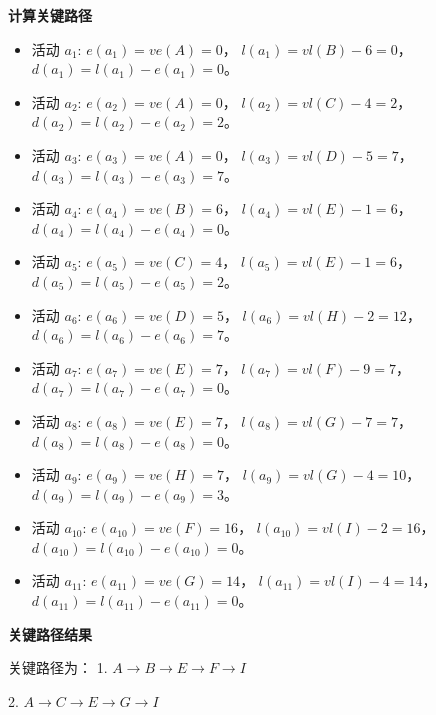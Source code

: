 \documentclass[lang=cn,newtx,10pt,scheme=chinese]{elegantbook}
\begin{document}
\textbf{计算关键路径}
\begin{itemize}
  \item 活动 $a_1$:  
    $e(a_1) = ve(A) = 0$，  
    $l(a_1) = vl(B) - 6 = 0$，  
    $d(a_1) = l(a_1) - e(a_1) = 0$。

  \item 活动 $a_2$:  
    $e(a_2) = ve(A) = 0$，  
    $l(a_2) = vl(C) - 4 = 2$，  
    $d(a_2) = l(a_2) - e(a_2) = 2$。

  \item 活动 $a_3$:  
    $e(a_3) = ve(A) = 0$，  
    $l(a_3) = vl(D) - 5 = 7$，  
    $d(a_3) = l(a_3) - e(a_3) = 7$。

  \item 活动 $a_4$:  
    $e(a_4) = ve(B) = 6$，  
    $l(a_4) = vl(E) - 1 = 6$，  
    $d(a_4) = l(a_4) - e(a_4) = 0$。

  \item 活动 $a_5$:  
    $e(a_5) = ve(C) = 4$，  
    $l(a_5) = vl(E) - 1 = 6$，  
    $d(a_5) = l(a_5) - e(a_5) = 2$。

  \item 活动 $a_6$:  
    $e(a_6) = ve(D) = 5$，  
    $l(a_6) = vl(H) - 2 = 12$，  
    $d(a_6) = l(a_6) - e(a_6) = 7$。

  \item 活动 $a_7$:  
    $e(a_7) = ve(E) = 7$，  
    $l(a_7) = vl(F) - 9 = 7$，  
    $d(a_7) = l(a_7) - e(a_7) = 0$。

  \item 活动 $a_8$:  
    $e(a_8) = ve(E) = 7$，  
    $l(a_8) = vl(G) - 7 = 7$，  
    $d(a_8) = l(a_8) - e(a_8) = 0$。

  \item 活动 $a_9$:  
    $e(a_9) = ve(H) = 7$，  
    $l(a_9) = vl(G) - 4 = 10$，  
    $d(a_9) = l(a_9) - e(a_9) = 3$。

  \item 活动 $a_{10}$:  
    $e(a_{10}) = ve(F) = 16$，  
    $l(a_{10}) = vl(I) - 2 = 16$，  
    $d(a_{10}) = l(a_{10}) - e(a_{10}) = 0$。

  \item 活动 $a_{11}$:  
    $e(a_{11}) = ve(G) = 14$，  
    $l(a_{11}) = vl(I) - 4 = 14$，  
    $d(a_{11}) = l(a_{11}) - e(a_{11}) = 0$。
\end{itemize}

\textbf{关键路径结果}

关键路径为：  
1. $A \to B \to E \to F \to I$  

2. $A \to C \to E \to G \to I$
\end{document}
